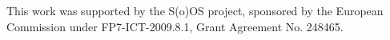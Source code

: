 %

\acks

This work was supported by the S(o)OS project, sponsored by the
European Commission under FP7-ICT-2009.8.1, Grant Agreement
No. 248465.


